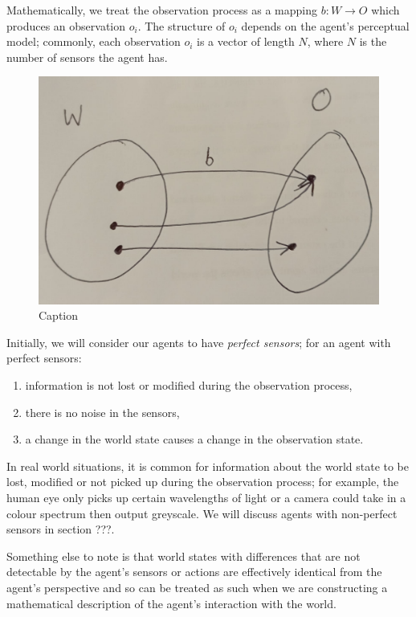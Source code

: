 Mathematically, we treat the observation process as a mapping $b: W \to O$ which produces an observation $o_{i}$.
The structure of $o_{i}$ depends on the agent's perceptual model; commonly, each observation $o_{i}$ is a vector of length $N$, where $N$ is the number of sensors the agent has.

\begin{figure}
    \centering
    \includegraphics[width=0.5\linewidth]{2MathematicalFramework/InitialFramework/Images/observation_process_W_to_O.jpeg}
    \caption{Caption}
    \label{fig:observation_process_W_to_O}
\end{figure}

Initially, we will consider our agents to have \emph{perfect sensors}; for an agent with perfect sensors:
\begin{enumerate}
    \item information is not lost or modified during the observation process,
    \item there is no noise in the sensors, 
    \item a change in the world state causes a change in the observation state.
\end{enumerate}

In real world situations, it is common for information about the world state to be lost, modified or not picked up during the observation process; for example, the human eye only picks up certain wavelengths of light or a camera could take in a colour spectrum then output greyscale.
We will discuss agents with non-perfect sensors in section ???.

Something else to note is that world states with differences that are not detectable by the agent's sensors or actions are effectively identical from the agent's perspective and so can be treated as such when we are constructing a mathematical description of the agent's interaction with the world.

